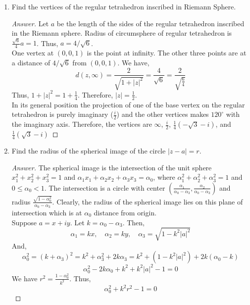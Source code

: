 \begin{enumerate}
\begin{proof}[Answer]
	\end{proof}

	\item Find the vertices of the regular tetrahedron inscribed in Riemann Sphere.
	\begin{proof}[Answer]
		Let $a$ be the length of the sides of the regular tetrahedron inscribed in the Riemann sphere.
		Radius of circumsphere of regular tetrahedron is $\frac{\sqrt{6}}{4}a = 1$.
		Thus, $a = 4/\sqrt{6}$.\\

		One vertex at $(0,0,1)$ is the point at infinity.
		The other three points are at a distance of $4/\sqrt{6}$ from $(0,0,1)$.
		We have, 
		\[d(z,\infty) = \frac{2}{\sqrt{1+|z|^2}} = \frac{4}{\sqrt{6}} = \frac{2}{\sqrt{\frac{6}{4}}} \]
		Thus, $1+|z|^2 = 1+\frac{1}{4}$.
		Therefore, $|z| = \frac{1}{2}$.\\

		In its general position the projection of one of the base vertex on the regular tetrahedron is purely imaginary ($\frac{i}{2}$) and the other vertices makes $120^\circ$ with the imaginary axis.
		Therefore, the vertices are $\infty$, $\frac{i}{2}$, $\frac{1}{4}\left(-\sqrt{3}-i\right)$, and $\frac{1}{4}\left(\sqrt{3}-i\right)$
		\end{proof}

	\item Find the radius of the spherical image of the circle $|z-a|=r$.
	\begin{proof}[Answer]
		The spherical image is the intersection of the unit sphere $x_1^2+x_2^2+x_3^2=1$ and $\alpha_1x_1 + \alpha_2x_2 + \alpha_3x_3 = \alpha_0$, where $\alpha_1^2+\alpha_2^2+\alpha_3^2 =1$ and $0 \le \alpha_0 < 1$.
		The intersection is a circle with center $\left(\frac{\alpha_1}{\alpha_0-\alpha_3},\frac{\alpha_2}{\alpha_0-\alpha_3}\right)$ and radius $\frac{\sqrt{1-\alpha_0^2}}{\alpha_0-\alpha_3}$.
		Clearly, the radius of the spherical image lies on this plane of intersection which is at $\alpha_0$ distance from origin.\\

		Suppose $a = x+iy$.
		Let $k = \alpha_0 - \alpha_3$.
		Then,
		\[ \alpha_1 = kx,\quad \alpha_2 = ky,\quad \alpha_3 = \sqrt{1-k^2|a|^2} \]
		And,
		\[ \alpha_0^2 = (k+\alpha_3)^2 = k^2+\alpha_3^2+2k\alpha_3 = k^2+(1-k^2|a|^2)+2k(\alpha_0-k) \]
		\begin{equation}
			\alpha_0^2-2k\alpha_0+k^2+k^2|a|^2-1 = 0 
			\label{eqn:alpha0a}
		\end{equation}
		We have $r^2 = \frac{1-\alpha_0^2}{k^2}$.
		Thus,
		\begin{equation}
			\alpha_0^2 + k^2r^2 - 1 = 0 
			\label{eqn:alpha0b}
		\end{equation}


\end{proof}
\end{enumerate}
